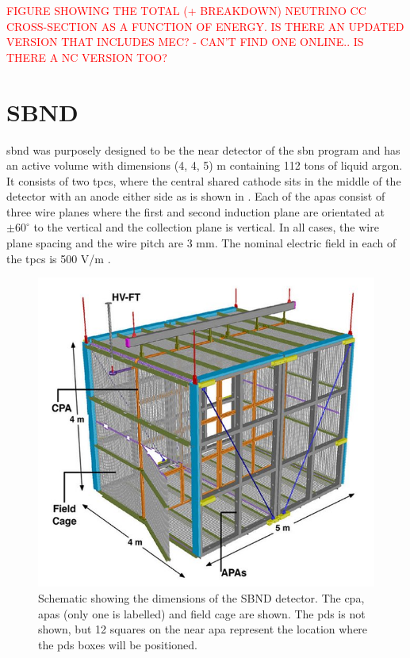 \textcolor{red}{FIGURE SHOWING THE TOTAL (+ BREAKDOWN) NEUTRINO CC CROSS-SECTION AS A FUNCTION OF ENERGY. IS THERE AN UPDATED VERSION THAT INCLUDES MEC? - CAN'T FIND ONE ONLINE.. IS THERE A NC VERSION TOO?}

\section{SBND}\label{sec:SBND}

\gls{sbnd} was purposely designed to be the near detector of the \gls{sbn} program and has an active volume with dimensions (4, 4, 5) m containing 112 tons of liquid argon. It consists of two \glspl{tpc}, where the central shared cathode sits in the middle of the detector with an anode either side as is shown in . Each of the \glspl{apa} consist of three wire planes where the first and second induction plane are orientated at $\pm 60^{\circ}$ to the vertical and the collection plane is vertical. In all cases, the wire plane spacing and the wire pitch are 3 mm. The nominal electric field in each of the \glspl{tpc} is 500 V/m \cite{SBN_Proposal}. 

\begin{figure}[!h]
    \centering
    \includegraphics[width = \largefigwidth]{figures-chap3/SBND.jpg}
    \caption[Schematic of the SBN detector.]{Schematic showing the dimensions of the SBND detector. The \gls{cpa}, \glspl{apa} (only one is labelled) and field cage are shown. The \gls{pds} is not shown, but 12 squares on the near \gls{apa} represent the location where the \gls{pds} boxes will be positioned. \cite{LArTPC_review}}
    \label{fig:sbnd_schematic}
\end{figure}


